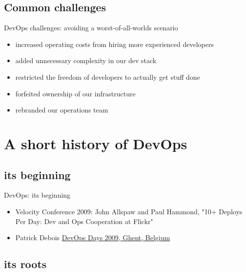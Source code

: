 \documentclass{beamer}
\begin{document}
	\subsection{Common challenges}
	\begin{frame}{DevOps challenges: avoiding a worst-of-all-worlds scenario}
		\begin{itemize}
			\item increased operating costs from hiring more experienced developers \pause
			\item added unnecessary complexity in our dev stack \pause
			\item restricted the freedom of developers to actually get stuff done \pause
			\item forfeited ownership of our infrastructure \pause 
			\item rebranded our operations team
		\end{itemize}
	\end{frame}
	\section{A short history of DevOps}
	\subsection{its beginning}
	\begin{frame}{DevOps: its beginning}
		\begin{itemize}
			\item Velocity Conference 2009: John Allspaw and Paul Hammond, "10+ Deploys Per Day: Dev and Ops Cooperation at Flickr" \pause
			\item Patrick Debois \href{https://youtu.be/EOveXZhJpr4}{DevOps Days 2009, Ghent, Belgium}
		\end{itemize}
	\end{frame}
	\subsection{its roots}
\end{document}
